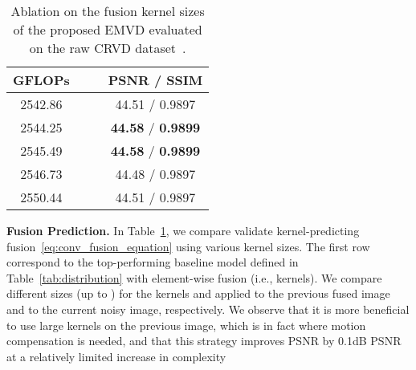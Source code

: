\documentclass[final]{cvpr}
\newcommand{\textapprox}{}
\begin{document}
    \begin{table}[t]
        \centering
        \small
\vspace{-0.2cm}
        \begin{tabular}{cccc}
            \hline
            GFLOPs  &  &  & PSNR / SSIM   \\
            \hline \hline
            2542.86 &  &  & 44.51 / 0.9897   \\
            2544.25 &  &  & \textbf{44.58} / \textbf{0.9899}   \\
            2545.49 &  &  & \textbf{44.58} / \textbf{0.9899}   \\
            2546.73 &  &  & 44.48 / 0.9897   \\
            2550.44 &  &  & 44.51 / 0.9897   \\
            \hline
        \end{tabular}
        \vspace{-0.1cm}
        \caption{Ablation on the fusion kernel sizes of the proposed EMVD evaluated on the raw CRVD dataset~\cite{yue2020supervised}.}
        \label{tab:kpn_fusion}
        \vspace{-0.3cm}
    \end{table}

    \textbf{Fusion Prediction.} In Table~\ref{tab:kpn_fusion}, we compare validate kernel-predicting fusion~\eqref{eq:conv_fusion_equation} using various kernel sizes. The first row correspond to the top-performing baseline model defined in Table~\ref{tab:distribution} with element-wise fusion (i.e.,  kernels). We compare different sizes (up to ) for the kernels  and  applied to the previous fused image and to the current noisy image, respectively. We observe that it is more beneficial to use large kernels on the previous image, which is in fact where motion compensation is needed, and that this strategy improves PSNR by \textapprox0.1dB PSNR at a relatively limited increase in complexity
\end{document}
